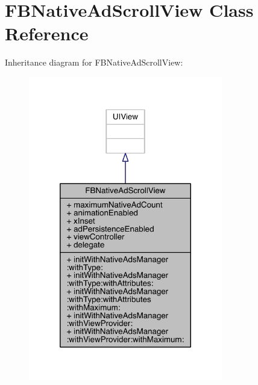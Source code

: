 \hypertarget{interface_f_b_native_ad_scroll_view}{\section{F\-B\-Native\-Ad\-Scroll\-View Class Reference}
\label{interface_f_b_native_ad_scroll_view}
}


Inheritance diagram for F\-B\-Native\-Ad\-Scroll\-View\-:
\nopagebreak
\begin{figure}[H]
\begin{center}
\leavevmode
\includegraphics[width=240pt]{interface_f_b_native_ad_scroll_view__inherit__graph}
\end{center}
\end{figure}


